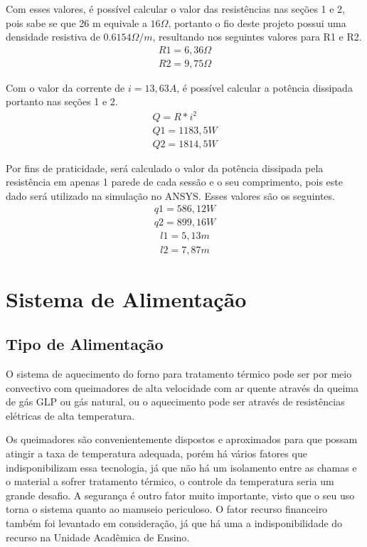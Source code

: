 Com esses valores, é possível calcular o valor das resistências nas seções 1 e 2, pois sabe se que 26 m equivale a $16 \Omega$, portanto o fio deste projeto possui uma densidade resistiva de $0.6154 \Omega /m$, resultando nos seguintes valores para R1 e R2.
\begin{gather}
    R1 = 6,36\Omega \nonumber \\
    R2 = 9,75\Omega \nonumber
\end{gather}

Com o valor da corrente de $i = 13,63 A$, é possível calcular a potência dissipada portanto nas seções 1 e 2.
\begin{gather}
    Q = R*i^{2} \\
    Q1 = 1183,5W \nonumber \\
    Q2 = 1814,5W \nonumber
\end{gather}


Por fins de praticidade, será calculado o valor da potência dissipada pela resistência em apenas 1 parede de cada sessão e o seu comprimento, pois este dado será utilizado na simulação no ANSYS\@. Esses valores são os seguintes.
\begin{gather}
    q1 = 586,12W \nonumber \\
    q2 = 899,16W \nonumber
\end{gather}
\begin{gather}
    l1 = 5,13m \nonumber \\
    l2 = 7,87m \nonumber
\end{gather}

\section{Sistema de Alimentação}
\subsection{Tipo de Alimentação}
O sistema de aquecimento do forno para tratamento térmico pode ser por meio convectivo com queimadores de alta velocidade com ar quente através da queima de gás GLP ou gás natural, ou o aquecimento pode ser através de resistências elétricas de alta temperatura.

Os queimadores são convenientemente dispostos e aproximados para que possam atingir a taxa de temperatura adequada, porém há vários fatores que indisponibilizam essa tecnologia, já que não há um isolamento entre as chamas e o material a sofrer tratamento térmico, o controle da temperatura seria um grande desafio. A segurança é outro fator muito importante, visto que o seu uso torna o sistema quanto ao manuseio periculoso. O fator recurso financeiro também foi levantado em consideração, já que há uma a indisponibilidade do recurso na Unidade Acadêmica de Ensino.

